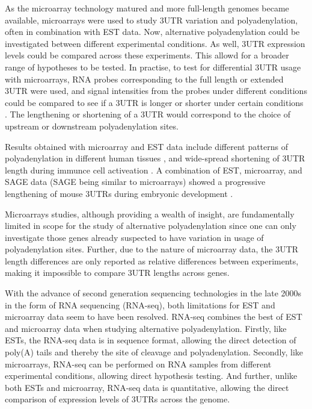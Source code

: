 As the microarray technology matured and more full-length genomes became
available, microarrays were used to study 3\p UTR variation and
polyadenylation, often in combination with EST data. Now, alternative
polyadenylation could be investigated between different experimental
conditions. As well, 3UTR expression levels could be compared across these
experiments. This allowd for a broader range of hypotheses to be tested. In
practise, to test for differential 3UTR usage with microarrays, RNA probes
corresponding to the full length or extended 3UTR were used, and signal
intensities from the probes under different conditions could be compared to see
if a 3UTR is longer or shorter under certain conditions
\cite{sandberg_proliferating_2008, ji_progressive_2009}. The lengthening or
shortening of a 3\p UTR would correspond to the choice of upstream or
downstream polyadenylation sites.

Results obtained with microarray and EST data include different patterns of
polyadenylation in different human tissues \cite{zhang_biased_2005}, and
wide-spread shortening of 3\p UTR length during immunce cell activeation
\cite{sandberg_proliferating_2008}. A combination of EST, microarray, and SAGE
data (SAGE being similar to microarrays) showed a progressive lengthening of
mouse 3\p UTRs during embryonic development \cite{ji_progressive_2009}.

Microarrays studies, although providing a wealth of insight, are fundamentally
limited in scope for the study of alternative polyadenylation since one can
only investigate those genes already suspected to have variation in usage of
polyadenylation sites. Further, due to the nature of microarray data, the 3UTR
length differences are only reported as relative differences between
experiments, making it impossible to compare 3UTR lengths across genes.

With the advance of second generation sequencing technologies in the late 2000s
in the form of RNA sequencing (RNA-seq), both limitations for EST and
microarray data seem to have been resolved. RNA-seq combines the best of EST
and microarray data when studying alternative polyadenylation. Firstly, like
ESTs, the RNA-seq data is in sequence format, allowing the direct detection
of poly(A) tails and thereby the site of cleavage and polyadenylation.
Secondly, like microarrays, RNA-seq can be performed on RNA samples from
different experimental conditions, allowing direct hypothesis testing. And
further, unlike both ESTs and microarray, RNA-seq data is quantitative,
allowing the direct comparison of expression levels of 3\p UTRs across the
genome.

